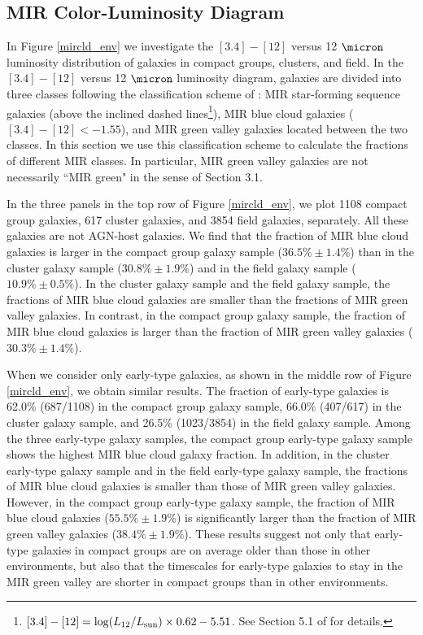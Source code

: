 \documentclass[12pt,preprint,apj]{emulateapj}
\begin{document}
\subsection{MIR Color-Luminosity Diagram}

In Figure \ref{mircld_env} we investigate the $[3.4]-[12]$ versus 
12 $\micron$ luminosity distribution of galaxies in compact groups, clusters, and field. 
In the $[3.4]-[12]$ versus 12 $\micron$ luminosity diagram, galaxies are divided 
into three classes following the classification scheme of \citet{lee+15}: 
MIR star-forming sequence galaxies (above the inclined dashed lines\footnote{
$[3.4]-[12] = {\rm log}(L_{12}/L_{\rm sun})\times0.62-5.51$. See Section 5.1 of 
\citet{lee+15} for details.}), 
MIR blue cloud galaxies ($[3.4]-[12]<-1.55$), and MIR green valley galaxies 
located between the two classes.
In this section we use this classification scheme to calculate the fractions of 
different MIR classes.
In particular, MIR green valley galaxies are not necessarily 
``MIR green" in the sense of Section 3.1.

In the three panels in the top row of Figure \ref{mircld_env}, 
we plot 1108 compact group galaxies, 617 cluster galaxies, and 3854 field galaxies,
separately. All these galaxies are not AGN-host galaxies. 
We find that the fraction of MIR blue cloud galaxies is larger in the compact group galaxy 
sample ($36.5\%\pm1.4\%$) than in the cluster galaxy sample ($30.8\%\pm1.9\%$) 
and in the field galaxy sample ($10.9\%\pm0.5\%$). 
In the cluster galaxy sample and the field galaxy sample, the fractions of 
MIR blue cloud galaxies are smaller than the fractions of MIR green valley galaxies.
In contrast, in the compact group galaxy sample, the fraction of MIR blue cloud 
galaxies is larger than the fraction of MIR green valley galaxies ($30.3\%\pm1.4\%$).

When we consider only early-type galaxies, as shown in the middle row of 
Figure \ref{mircld_env}, we obtain similar results. 
The fraction of early-type galaxies is 62.0\% (687/1108) in the compact group
galaxy sample, 66.0\% (407/617) in the cluster galaxy sample, and 
26.5\% (1023/3854) in the field galaxy sample.
Among the three early-type galaxy samples, the compact group early-type galaxy 
sample shows the highest MIR blue cloud galaxy fraction.
In addition, 
in the cluster early-type galaxy sample and in the field early-type galaxy sample, 
the fractions of MIR blue cloud galaxies is smaller than those of MIR green valley 
galaxies. However, in the compact group early-type galaxy sample, the fraction 
of MIR blue cloud galaxies ($55.5\%\pm1.9\%$) is significantly larger than 
the fraction of MIR green valley galaxies ($38.4\%\pm1.9\%$). 
These results suggest not only that early-type galaxies in compact groups are 
on average older than those in other environments, but also that 
the timescales for early-type galaxies to stay in the MIR green valley are 
shorter in compact groups than in other environments.
\end{document}
